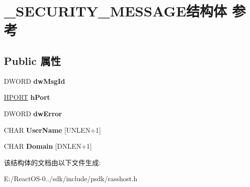 \hypertarget{struct___s_e_c_u_r_i_t_y___m_e_s_s_a_g_e}{}\section{\+\_\+\+S\+E\+C\+U\+R\+I\+T\+Y\+\_\+\+M\+E\+S\+S\+A\+G\+E结构体 参考}
\label{struct___s_e_c_u_r_i_t_y___m_e_s_s_a_g_e}
\subsection*{Public 属性}
\begin{DoxyCompactItemize}
\item 
\mbox{\label{struct___s_e_c_u_r_i_t_y___m_e_s_s_a_g_e_a97aa6c5b938b107db14c37b74c39174a}} 
D\+W\+O\+RD {\bfseries dw\+Msg\+Id}
\item 
\mbox{\label{struct___s_e_c_u_r_i_t_y___m_e_s_s_a_g_e_a2dd66de86a5f237ab4c44fad0dcc9f2a}} 
\hyperlink{interfacevoid}{H\+P\+O\+RT} {\bfseries h\+Port}
\item 
\mbox{\label{struct___s_e_c_u_r_i_t_y___m_e_s_s_a_g_e_a26fbaa856680f5add7724df3e2f80b2a}} 
D\+W\+O\+RD {\bfseries dw\+Error}
\item 
\mbox{\label{struct___s_e_c_u_r_i_t_y___m_e_s_s_a_g_e_afd8473a5c2c0ed0082dd504453ad0590}} 
C\+H\+AR {\bfseries User\+Name} \mbox{[}U\+N\+L\+EN+1\mbox{]}
\item 
\mbox{\label{struct___s_e_c_u_r_i_t_y___m_e_s_s_a_g_e_a0635bb9bd56734bfee07d956f3a338bc}} 
C\+H\+AR {\bfseries Domain} \mbox{[}D\+N\+L\+EN+1\mbox{]}
\end{DoxyCompactItemize}


该结构体的文档由以下文件生成\+:\begin{DoxyCompactItemize}
\item 
E\+:/\+React\+O\+S-\/0../sdk/include/psdk/rasshost.\+h\end{DoxyCompactItemize}
